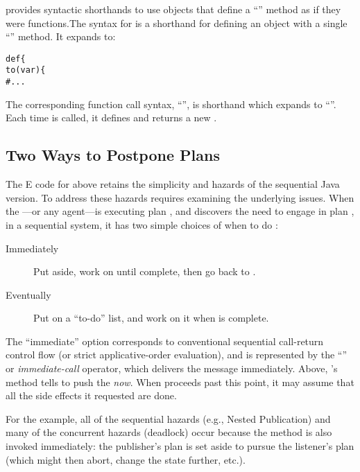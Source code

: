 \documentclass{llncs}
\begin{document}
 provides syntactic shorthands to use objects that define a
``'' method as if they were functions.The syntax for
 is a shorthand for defining an object with a
single ``'' method. It expands to:
%
\begin{alltt}
    def  \{
        to (var ) \{
            # ...
\end{alltt}
%
The corresponding function call syntax,
``'', is shorthand which expands to
``''. Each time  is
called, it defines and returns a new .

\subsection{Two Ways to Postpone Plans}

The E code for  above retains the simplicity and
hazards of the sequential Java version.  To address these hazards
requires examining the underlying issues.  When the
---or any agent---is executing plan , and
discovers the need to engage in plan , in a sequential system,
it has two simple choices of when to do :
%
\begin{description}

\item[Immediately] Put  aside, work on  until
complete, then go back to .

\item[Eventually] Put  on a ``to-do'' list, and work on it
when  is complete.

\end{description}
%
The ``immediate'' option corresponds to conventional sequential
call-return control flow (or strict applicative-order evaluation), and
is represented by the ``'' or \emph{immediate-call}
operator, which delivers the message immediately. Above,
's  method tells
 to push the  \emph{now}. When
 proceeds past this point, it may assume that all
the side effects it requested are done.  

For the  example, all of the sequential hazards
(e.g., Nested Publication) and many of the concurrent hazards
(deadlock) occur because the  method is also
invoked immediately: the publisher's plan is set aside to pursue the
listener's plan (which might then abort, change the state further,
etc.).
\end{document}

